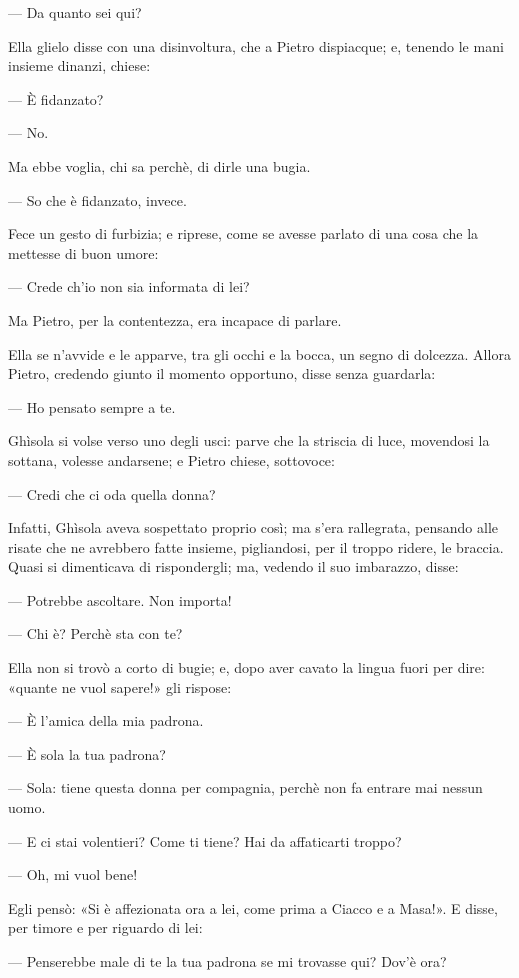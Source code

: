 — Da quanto sei qui?

Ella glielo disse con una disinvoltura, che a Pietro dispiacque; e, tenendo le mani insieme dinanzi, chiese:

— È fidanzato?

— No.

Ma ebbe voglia, chi sa perchè, di dirle una bugia.

— So che è fidanzato, invece.

Fece un gesto di furbizia; e riprese, come se avesse parlato di una cosa che la mettesse di buon umore:

— Crede ch'io non sia informata di lei?

Ma Pietro, per la contentezza, era incapace di parlare.

Ella se n’avvide e le apparve, tra gli occhi e la bocca, un segno di dolcezza. Allora Pietro, credendo giunto il momento opportuno, disse senza guardarla:

— Ho pensato sempre a te.

Ghìsola si volse verso uno degli usci: parve che la striscia di luce, movendosi la sottana, volesse andarsene; e Pietro chiese, sottovoce:

— Credi che ci oda quella donna?

Infatti, Ghìsola aveva sospettato proprio così; ma s’era rallegrata, pensando alle risate che ne avrebbero fatte insieme, pigliandosi, per il troppo ridere, le braccia. Quasi si dimenticava di rispondergli; ma, vedendo il suo imbarazzo, disse:

— Potrebbe ascoltare. Non importa!

— Chi è? Perchè sta con te?

Ella non si trovò a corto di bugie; e, dopo aver cavato la lingua fuori per dire: «quante ne vuol sapere!» gli rispose:

— È l’amica della mia padrona.

— È sola la tua padrona?

— Sola: tiene questa donna per compagnia, perchè non fa entrare mai nessun uomo.

— E ci stai volentieri? Come ti tiene? Hai da affaticarti troppo?

— Oh, mi vuol bene!

Egli pensò: «Si è affezionata ora a lei, come prima a Ciacco e a Masa!». E disse, per timore e per riguardo di lei:

— Penserebbe male di te la tua padrona se mi trovasse qui? Dov’è ora?

